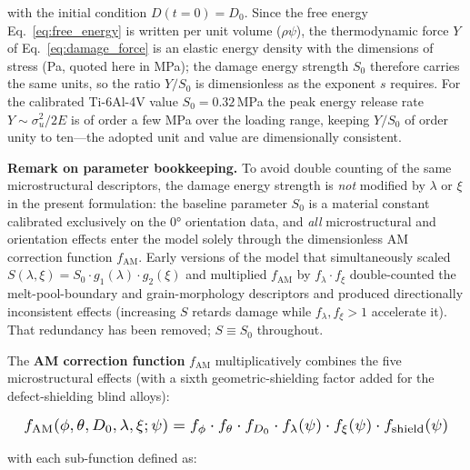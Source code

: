 \documentclass[12pt,a4paper,twocolumn]{article}
\begin{document}
with the initial condition $D(t=0) = D_0$. Since the free energy Eq.~\eqref{eq:free_energy} is written per unit volume ($\rho\psi$), the thermodynamic force $Y$ of Eq.~\eqref{eq:damage_force} is an elastic energy density with the dimensions of stress (Pa, quoted here in MPa); the damage energy strength $S_0$ therefore carries the same units, so the ratio $Y/S_0$ is dimensionless as the exponent $s$ requires. For the calibrated Ti-6Al-4V value $S_0 = 0.32$\,MPa the peak energy release rate $Y \sim \sigma_u^2/2E$ is of order a few MPa over the loading range, keeping $Y/S_0$ of order unity to ten---the adopted unit and value are dimensionally consistent.

\textbf{Remark on parameter bookkeeping.} To avoid double counting of the same microstructural descriptors, the damage energy strength is \emph{not} modified by $\lambda$ or $\xi$ in the present formulation: the baseline parameter $S_0$ is a material constant calibrated exclusively on the $\ang{0}$ orientation data, and \emph{all} microstructural and orientation effects enter the model solely through the dimensionless AM correction function $f_{\text{AM}}$. Early versions of the model that simultaneously scaled $S(\lambda,\xi) = S_0 \cdot g_1(\lambda) \cdot g_2(\xi)$ and multiplied $f_{\text{AM}}$ by $f_\lambda \cdot f_\xi$ double-counted the melt-pool-boundary and grain-morphology descriptors and produced directionally inconsistent effects (increasing $S$ retards damage while $f_\lambda, f_\xi > 1$ accelerate it). That redundancy has been removed; $S \equiv S_0$ throughout.

The \textbf{AM correction function} $f_{\text{AM}}$ multiplicatively combines the five microstructural effects (with a sixth geometric-shielding factor added for the defect-shielding blind alloys):

\begin{equation}
\resizebox{0.97\columnwidth}{!}{$\displaystyle f_{\text{AM}}(\phi, \theta, D_0, \lambda, \xi; \psi) = f_\phi \cdot f_\theta \cdot f_{D_0} \cdot f_\lambda(\psi) \cdot f_\xi(\psi) \cdot f_{\text{shield}}(\psi)$}
\label{eq:f_AM}
\end{equation}

with each sub-function defined as:
\end{document}
